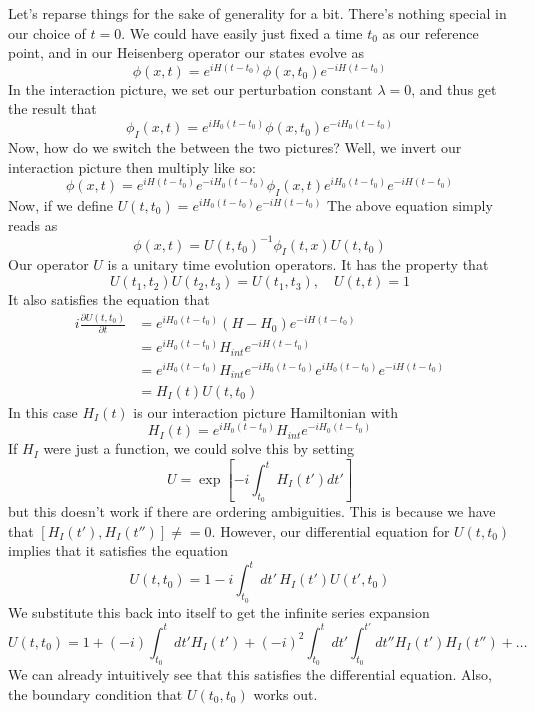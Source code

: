 Let's reparse things for the sake of generality for a bit. 
There's nothing special in our choice of $ t = 0$. 
We could have easily just fixed a time  $ t_0 $ as our reference point, 
and in our Heisenberg operator our states evolve as 
\[
\phi ( x ,t ) = e^{ i H ( t - t_0 ) } \phi ( x, t_0 ) e^{  - i H ( t - t_0 ) }
\] In the interaction picture, we set our perturbation constant $ \lambda = 0$, and thus
get the result that 
\[
\phi_I ( x, t ) = e^{ i H_0 ( t - t_0 ) } \phi( x, t_0 ) e^{ - i H_0 ( t - t_0 ) }
\] Now, how do we switch the between the two pictures? 
Well, we invert our interaction picture then multiply like so: 
\[
\phi ( x, t) = e^{ i H ( t - t_0 ) } e^{  -i H_0 ( t - t_0 ) } \phi_I ( x, t ) e^{ i H_0 ( t - t_0 ) } e^{  - i H ( t - t_0 ) }
\] Now, if we define $ U ( t, t_0 ) = e^{ i H_0 ( t - t_0 ) } e^{  - i H ( t - t_0 ) }$
The above equation simply reads as 
\[
\phi ( x, t ) = U ( t, t_0 )^{ -1 }  \phi_ I ( t , x) U ( t, t_0 ) 
\] Our operator $ U $ is a unitary time evolution operators. It has the property that 
\[
U ( t_1 , t_2) U ( t_2, t_3 ) = U ( t_1, t_3), \quad U ( t, t) = 1 
\] It also satisfies the equation that 
\begin{align*} 
i \frac{\partial  U ( t, t_0 ) }{\partial t }  &=  e^{ i H_0 ( t -t_0 ) } ( H - H_0 ) e^{  - i H ( t - t_0 ) }  \\
		       &=  e^{ i H_0 ( t - t_0 ) } H_{int} e^{  -i H ( t - t_0 ) }  \\
		       &=  e^{ i H_0 ( t - t_0 ) } H_{int} e^{  - i H_0 ( t - t_0 ) } e^{ i H_0 ( t - t_0 ) } e^{  - iH ( t - t_0 ) }\\
		       &=  H_I ( t) U ( t, t_0)  
\end{align*} In this case $ H _I ( t) $ is our interaction picture 
Hamiltonian with 
\[
H_I ( t )  = e^{ i H_0 ( t - t_0 ) } H_{ int} e^{  - i H_0 ( t - t_0 ) }
\] 
If $ H_I $ were just a function, we could solve this by setting
\[
U = \exp \left[  - i \int_{t_ 0 }^ t H_I ( t' ) dt '  \right] 
\] but this doesn't work if there are ordering ambiguities.
This is because we have that $ [ H_I ( t' ), H _I ( t'' ) ] \neq = 0 $. 
However, our differential equation for  $ U ( t, t_0 ) $ implies that it
satisfies the equation 
\[
U ( t , t_0 ) = 1 - i \int_{ t_0 }^ t dt' \, H_I ( t' ) U ( t' , t_0 ) 
\] We substitute this back into itself to  get the infinite series 
expansion 
\[
U ( t, t_0) = 1 + ( - i ) \int_{ t_0}^ t dt' H_I ( t' ) + ( -i ) ^ 2 \int_{t_0}^t dt' \int_{t_0 }^{ t' }  dt'' H_I ( t' ) H_I ( t'' ) + \dots 
\] We can already intuitively see that 
this satisfies the differential equation. 
Also, the boundary condition that $ U ( t_0 , t_0 ) $ works out. 

